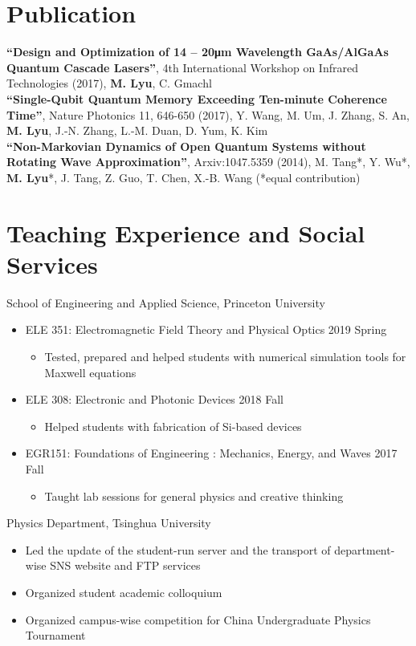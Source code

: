 \documentclass[11pt,letterpaper]{resume}
\begin{document}
\section{Publication}
\textbf{``Design and Optimization of 14 -- 20\si{\micro m} Wavelength 
GaAs/AlGaAs Quantum Cascade Lasers''}, 
4th International Workshop on Infrared Technologies (2017), 
\textbf{M. Lyu}, C. Gmachl \\
\textbf{``Single-Qubit Quantum Memory Exceeding Ten-minute Coherence Time''}, 
Nature Photonics 11, 646-650 (2017), Y. Wang, M. Um, J. Zhang, S. An, 
\textbf{M. Lyu}, J.-N. Zhang, L.-M. Duan, D. Yum, K. Kim \\
\textbf{``Non-Markovian Dynamics of Open Quantum Systems without Rotating 
Wave Approximation''}, 
Arxiv:1047.5359 (2014), 
M. Tang*, Y. Wu*, \textbf{M. Lyu}*, J. Tang, Z. Guo, T. Chen, X.-B. Wang  
(*equal contribution)

\section{Teaching Experience and Social Services}
School of Engineering and Applied Science, Princeton University
\begin{itemize}
    \item ELE 351: Electromagnetic Field Theory and Physical Optics
    \hfill 2019 Spring
    \begin{itemize}
        \item Tested, prepared and helped students with 
        numerical simulation tools for Maxwell equations
    \end{itemize}
    \item ELE 308: Electronic and Photonic Devices
    \hfill 2018 Fall
    \begin{itemize}
        \item Helped students with fabrication of Si-based devices
    \end{itemize}
    \item EGR151: Foundations of Engineering : Mechanics, Energy, and Waves
    \hfill 2017 Fall
    \begin{itemize}
        \item Taught lab sessions for general physics and creative thinking
    \end{itemize}
\end{itemize}\medskip

Physics Department, Tsinghua University
\begin{itemize}
    \item Led the update of the student-run server and 
    the transport of department-wise SNS website and FTP services
    \item Organized student academic colloquium 
    \item Organized campus-wise competition for China Undergraduate Physics 
    Tournament
\end{itemize}\medskip
\end{document}
